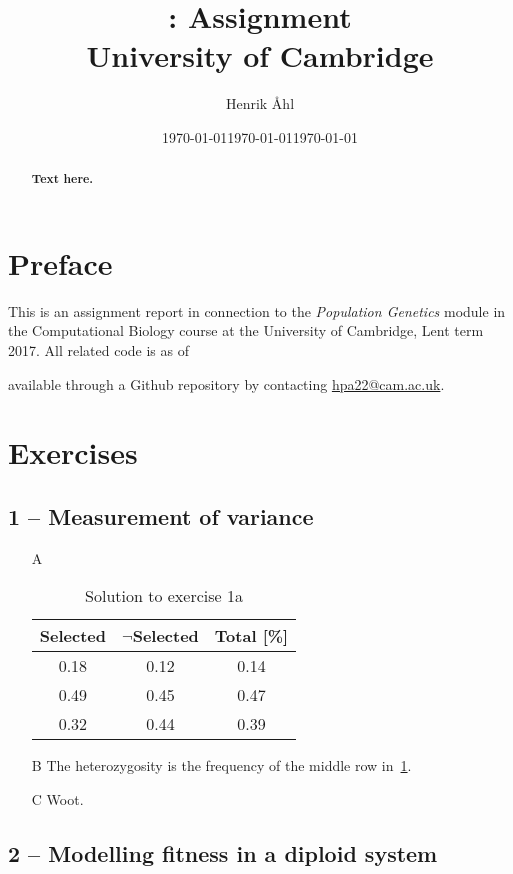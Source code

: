 \documentclass[10pt]{article}
\title{
  \bf \course: Assignment \ass \\[1em]
  \small{University of Cambridge}
}
\author{Henrik Åhl}
\date{\today}
\theoremstyle{plain}
\newcommand{\course}{Population Genetics}
\newcommand{\term}{Lent term 2017}
\begin{document}
\date{\today}
\maketitle
\setcounter{page}{1}

\begin{abstract}
{\bf 
  Text here.
}
\end{abstract}
\begin{multicols}{2}
\section*{Preface}
This is an assignment report in connection to the \textit{\course}
module in the Computational Biology course at the University of Cambridge,
\term. All related code is as of \date{\today} available through a
Github repository by contacting \href{mailto:hpa22@cam.ac.uk}{hpa22@cam.ac.uk}.

\section*{Exercises}
\subsection*{1 -- Measurement of variance}
\begin{enumerate}
  \item[A]~
   \begin{table}[H]
     \centering
     \caption{Solution to exercise 1a}\label{tab:exc1}
     \begin{tabular}{ccc}
       \toprule
       Selected  & $\neg$Selected  & Total [\%]\\
       \midrule
       0.18  & 0.12  & 0.14 \\
       0.49  & 0.45  & 0.47 \\
       0.32  & 0.44  & 0.39 \\\bottomrule
     \end{tabular}
   \end{table}
  \item[B] The heterozygosity is the frequency of the middle row in~\cref{tab:exc1}.

  \item[C] Woot. 
\end{enumerate}
\subsection*{2 -- Modelling fitness in a diploid system}

\end{multicols}
\end{document}

